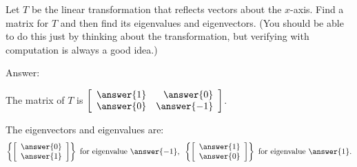 \documentclass{ximera}
\author{Zack Reed}
\begin{document}

\begin{problem}
  Let $T$ be the linear transformation that reflects vectors about
  the $x$-axis. Find a matrix for $T$ and then find its eigenvalues and
  eigenvectors. (You should be able to do this just by thinking about the transformation, but verifying with computation is always a good idea.)

  Answer: 

    The matrix of $T$ is $\startmat{rr}
      \answer{1} & \answer{0} \\
    \answer{0} & \answer{-1}
    \stopmat$. 
    
    The eigenvectors and eigenvalues are:
    \begin{equation*}
      \set{\startmat{c}
          \answer{0} \\
          \answer{1}
        \stopmat} ~\mbox{for eigenvalue}~ {\answer{-1}},
      \quad\set{\startmat{c}
          \answer{1} \\
          \answer{0}
        \stopmat} ~\mbox{for eigenvalue}~ {\answer{1}}.
    \end{equation*}

\end{problem}
\end{document}
